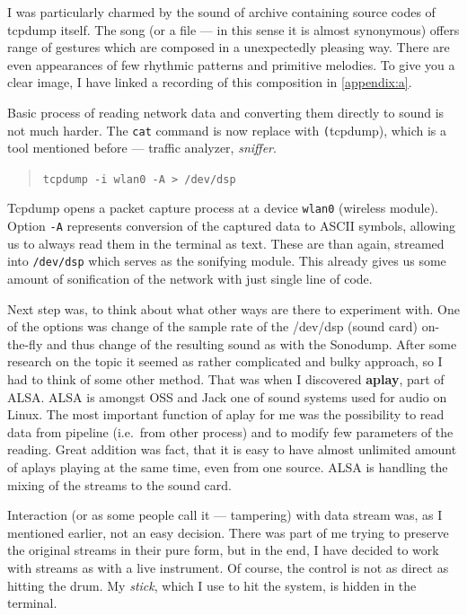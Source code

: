 \documentclass[12pt,a4paper,oneside]{report}
\begin{document}
I was particularly charmed by the sound of archive containing source codes of tcpdump itself. The song (or a file --- in this sense it is almost synonymous) offers range of gestures which are composed in a unexpectedly pleasing way. There are even appearances of few rhythmic patterns and primitive melodies. To give you a clear image, I have linked a recording of this composition in \autoref{appendix:a}.

Basic process of reading network data and converting them directly to sound is not much harder. The \texttt{cat} command is now replace with \texttt(tcpdump), which is a tool mentioned before --- traffic analyzer, \emph{sniffer}.
\begin{quotation}
	\texttt{tcpdump -i wlan0 -A > /dev/dsp} 
\end{quotation}

Tcpdump opens a packet capture process at a device \texttt{wlan0} (wireless module). Option \texttt{-A} represents conversion of the captured data to ASCII symbols, allowing us to always read them in the terminal as text. These are than again, streamed into \texttt{/dev/dsp} which serves as the sonifying module. This already gives us some amount of sonification of the network with just single line of code. 

Next step was, to think about what other ways are there to experiment with. One of the options was change of the sample rate of the /dev/dsp (sound card) on-the-fly and thus change of the resulting sound as with the Sonodump. After some research on the topic it seemed as rather complicated and bulky approach, so I had to think of some other method. That was when I discovered \textbf{aplay}, part of ALSA. ALSA is amongst OSS and Jack one of sound systems used for audio on Linux. The most important function of aplay for me was the possibility to read data from pipeline (i.e.\ from other process) and to modify few parameters of the reading. Great addition was fact, that it is easy to have almost unlimited amount of aplays playing at the same time, even from one source. ALSA is handling the mixing of the streams to the sound card.

Interaction (or as some people call it --- tampering) with data stream was, as I mentioned earlier, not an easy decision. There was part of me trying to preserve the original streams in their pure form, but in the end, I have decided to work with streams as with a live instrument. Of course, the control is not as direct as hitting the drum. My \emph{stick}, which I use to hit the system, is hidden in the terminal.
\end{document}

